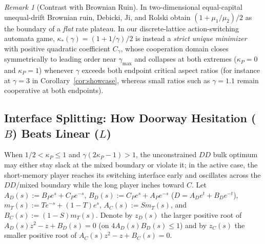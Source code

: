 \documentclass[11pt,reqno]{amsart}
\theoremstyle{definition}
\theoremstyle{remark}
\newtheorem{remark}[theorem]{Remark}
\begin{document}
\begin{remark}[Contrast with Brownian Ruin]
In two-dimensional equal-capital unequal-drift Brownian ruin, Debicki, Ji, and Rolski \cite{DJR2019} obtain $(1+\mu_1/\mu_2)/2$ as the boundary of a \emph{flat} rate plateau. In our discrete-lattice action-switching automata game, $\kappa_*(\gamma) = (1+1/\gamma)/2$ is instead a \emph{strict unique minimizer} with positive quadratic coefficient $C_\gamma$, whose cooperation domain closes symmetrically to leading order near $\gamma_{\max}$ and collapses at both extremes ($\kappa_P = 0$ and $\kappa_P = 1$) whenever $\gamma$ exceeds both endpoint critical aspect ratios (for instance at $\gamma = 3$ in Corollary~\ref{cor:showcase}, whereas small ratios such as $\gamma = 1.1$ remain cooperative at both endpoints).
\end{remark}

\subsection{Interface Splitting: How Doorway Hesitation (\texorpdfstring{$B$}{B}) Beats Linear (\texorpdfstring{$L$}{L})}
When $1/2 < \kappa_P \le 1$ and $\gamma(2\kappa_P - 1) > 1$, the unconstrained $DD$ bulk optimum may either stay slack at the mixed boundary or violate it; in the active case, the short-memory player reaches its switching interface early and oscillates across the $DD$/mixed boundary while the long player inches toward $C$. Let $A_D(s) := B_P e^s + C_P e^{-s}$, $B_D(s) := C_P e^s + A_P e^{-s}$ ($D = A_D e^t + B_D e^{-t}$), $m_T(s) := T e^{-s} + (1-T)e^s$, $A_C(s) := S m_T(s)$, and $B_C(s) := (1-S) m_T(s)$. Denote by $z_D(s)$ the larger positive root of $A_D(s) z^2 - z + B_D(s) = 0$ (on $4A_D(s)B_D(s) \le 1$) and by $z_C(s)$ the smaller positive root of $A_C(s) z^2 - z + B_C(s) = 0$.
\end{document}
